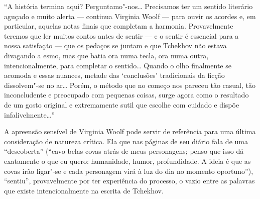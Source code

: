 ``A história termina aqui? Perguntamo"-nos\ldots{} Precisamos ter um sentido
literário aguçado e muito alerta --- continua Virginia Woolf --- para
ouvir os acordes e, em particular, aquelas notas finais que completam a
harmonia. Provavelmente teremos que ler muitos contos antes de sentir ---
e o sentir é essencial para a nossa satisfação --- que os pedaços se
juntam e que Tchekhov não estava divagando a esmo, mas que batia ora
numa tecla, ora numa outra, intencionalmente, para completar o
sentido\ldots{} Quando o olho finalmente se acomoda e essas nuances, metade
das `conclusões' tradicionais da ficção dissolvem"-se no ar\ldots{} Porém, o
método que no começo nos pareceu tão casual, tão inconcludente e
preocupado com pequenas coisas, surge agora como o resultado de um gosto
original e extremamente sutil que escolhe com cuidado e dispõe
infalivelmente\ldots{}''

A apreensão sensível de Virginia Woolf pode servir de referência para
uma última consideração de natureza crítica. Ela que nas páginas de seu
diário fala de uma ``descoberta'' (``cavo belas covas atrás de meus
personagens; penso que isso dá exatamente o que eu quero: humanidade,
humor, profundidade. A ideia é que as covas irão ligar"-se e cada
personagem virá à luz do dia no momento oportuno''), ``sentiu'',
provavelmente por ter experiência do processo, o vazio entre as palavras
que existe intencionalmente na escrita de Tchekhov.

